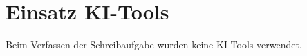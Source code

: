 \chapter{Einsatz KI-Tools}\label{ch:einsatz-ki-tools}
\renewcommand{\chapter}{\appendixname}
Beim Verfassen der Schreibaufgabe wurden keine KI-Tools verwendet.